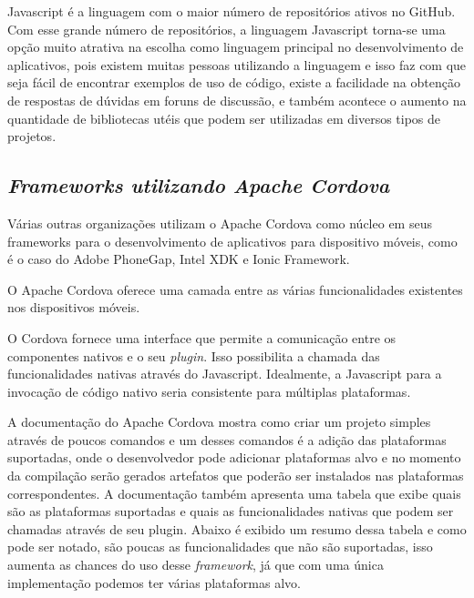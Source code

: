 Javascript é a linguagem com o maior número de repositórios ativos no GitHub. Com esse grande número de repositórios, a linguagem Javascript torna-se uma opção muito atrativa na escolha como linguagem principal no desenvolvimento de aplicativos, pois existem muitas pessoas utilizando a linguagem e isso faz com que seja fácil de encontrar exemplos de uso de código, existe a facilidade na obtenção de respostas de dúvidas em foruns de discussão, e também acontece o aumento na quantidade de bibliotecas utéis que podem ser utilizadas em diversos tipos de projetos.

\subsection{\normalfont\itshape Frameworks utilizando Apache Cordova}
Várias outras organizações utilizam o Apache Cordova como núcleo em seus frameworks para o desenvolvimento de aplicativos para dispositivo móveis, como é o caso do Adobe PhoneGap, Intel XDK e Ionic Framework.

O Apache Cordova oferece uma camada entre as várias funcionalidades existentes nos dispositivos móveis.
\begin{citacao}
O Cordova fornece uma interface que permite a comunicação entre os componentes nativos e o seu \textit{plugin}. Isso possibilita a chamada das funcionalidades nativas através do Javascript. Idealmente, a  Javascript para a invocação de código nativo seria consistente para múltiplas plataformas. \cite{cordova}
\end{citacao}

A documentação do Apache Cordova mostra como criar um projeto simples através de poucos comandos e um desses comandos é a adição das plataformas suportadas, onde o desenvolvedor pode adicionar plataformas alvo e no momento da compilação serão gerados artefatos que poderão ser instalados nas plataformas correspondentes.
A documentação também apresenta uma tabela que exibe quais são as plataformas suportadas e quais as funcionalidades nativas que podem ser chamadas através de seu plugin.
Abaixo é exibido um resumo dessa tabela e como pode ser notado, são poucas as funcionalidades que não são suportadas, isso aumenta as chances do uso desse \textit{framework}, já que com uma única implementação podemos ter várias plataformas alvo.


